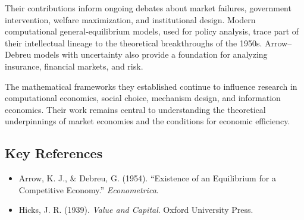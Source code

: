 Their contributions inform ongoing debates about market failures, government intervention, welfare
maximization, and institutional design. Modern computational general-equilibrium models, used for
policy analysis, trace part of their intellectual lineage to the theoretical breakthroughs of the
1950s. Arrow--Debreu models with uncertainty also provide a foundation for analyzing insurance,
financial markets, and risk.

The mathematical frameworks they established continue to influence research in computational
economics, social choice, mechanism design, and information economics. Their work remains central
to understanding the theoretical underpinnings of market economies and the conditions for economic
efficiency.

\subsection*{Key References}
\begin{itemize}
    \item Arrow, K. J., \& Debreu, G. (1954). ``Existence of an Equilibrium for a Competitive
    Economy.'' \textit{Econometrica}.
    \item Hicks, J. R. (1939). \textit{Value and Capital}. Oxford University Press.
\end{itemize}
